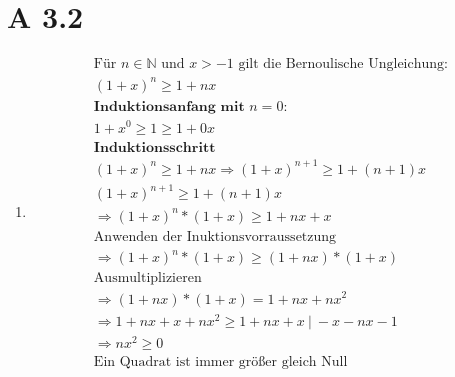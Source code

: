 \documentclass{article}
\begin{document}
    \section*{A 3.2}
        \begin{enumerate}[label = (\alph*)]
            \item 
                \begin{gather*}
                    \text{Für } n \in \mathbb{N} \text{ und } x > -1 \text{ gilt die Bernoulische Ungleichung:} \\
                    {(1+x)}^n \geq 1 + nx \\
                    \textbf{Induktionsanfang mit } n=0: \\
                    {1+x}^0 \geq 1 \geq 1 + 0x \\
                    \textbf{Induktionsschritt} \\
                    {(1+x)}^n \geq 1 + nx \Rightarrow {(1+x)}^{n+1} \geq 1 + (n+1)x \\
                    {(1+x)}^{n+1} \geq 1 + (n+1)x \\
                    \Rightarrow {(1+x)}^{n}*(1+x) \geq 1 + nx + x \\
                    \text{Anwenden der Inuktionsvorraussetzung} \\
                    \Rightarrow {(1+x)}^{n}*(1+x) \geq (1 + nx)*(1 + x) \\
                    \text{Ausmultiplizieren} \\
                    \Rightarrow (1 + nx)*(1 + x) = 1 + nx + nx^2 \\
                    \Rightarrow 1 + nx + x + nx^2 \geq 1 + nx + x  \: | \: -x - nx - 1\\
                    \Rightarrow nx^2 \geq 0 \\
                    \text{Ein Quadrat ist immer größer gleich Null}
                \end{gather*}


\end{enumerate}
\end{document}
